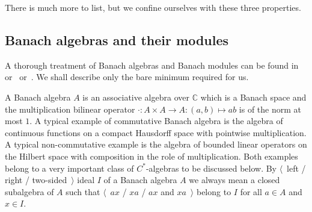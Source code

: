 There is much more to list, but we confine ourselves with these three
properties.


\subsection{
  Banach algebras and their modules}\label{SubSectionBanachAlgebrasAndTheirModules}

A thorough treatment of Banach algebras and Banach modules can be found
in~\cite{HelBanLocConvAlg} or~\cite{HelHomolBanTopAlg}
or~\cite{DalBanAlgAutCont}. We shall describe only the bare minimum required for
us.

A Banach algebra $A$ is an associative algebra over $\mathbb{C}$ which is a
Banach space and the multiplication bilinear operator 
$\cdot:A\times A\to A:(a,b)\mapsto ab$ is of the norm at most $1$. A typical
example of commutative Banach algebra is the algebra of continuous functions on
a compact Hausdorff space with pointwise multiplication. A typical non-commutative 
example is the algebra of bounded linear operators on the Hilbert
space with composition in the role of multiplication. Both examples belong to a
very important class of $C^*$-algebras to be discussed below. By $\langle$~left
/ right / two-sided~$\rangle$ ideal $I$ of a Banach algebra $A$ we always mean a
closed subalgebra of $A$ such that $\langle$~$ax$ / $xa$ / $ax$ and
$xa$~$\rangle$ belong to $I$ for all $a\in A$ and $x\in I$.

